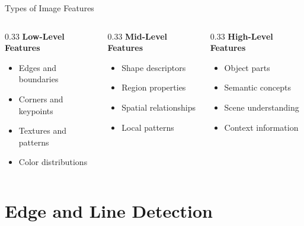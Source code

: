 \documentclass[aspectratio=169,10pt]{beamer}
\begin{document}
\begin{frame}{Types of Image Features}
    \begin{columns}[c]
        \begin{column}{0.33\textwidth}
            \textbf{Low-Level Features}
            \begin{itemize}
                \item Edges and boundaries
                \item Corners and keypoints
                \item Textures and patterns
                \item Color distributions
            \end{itemize}
        \end{column}
        \begin{column}{0.33\textwidth}
            \textbf{Mid-Level Features}
            \begin{itemize}
                \item Shape descriptors
                \item Region properties
                \item Spatial relationships
                \item Local patterns
            \end{itemize}
        \end{column}
        \begin{column}{0.33\textwidth}
            \textbf{High-Level Features}
            \begin{itemize}
                \item Object parts
                \item Semantic concepts
                \item Scene understanding
                \item Context information
            \end{itemize}
        \end{column}
    \end{columns}
\end{frame}

\section{Edge and Line Detection}
\end{document}
